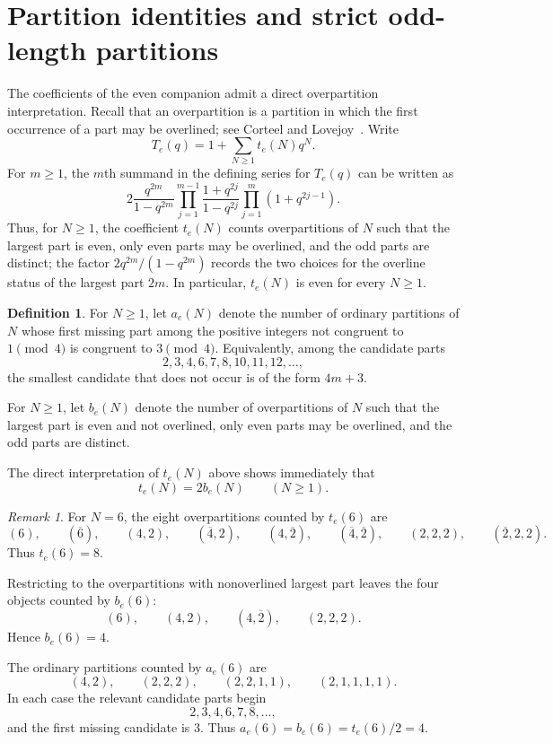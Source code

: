 \documentclass[reqno]{amsart}
\theoremstyle{plain}
\theoremstyle{definition}
\newtheorem{definition}{Definition}
\theoremstyle{remark}
\newtheorem{remark}{Remark}
\numberwithin{equation}{section}
\begin{document}
\section{Partition identities and strict odd-length partitions}\label{sec:partition-identities}
%
The coefficients of the even companion admit a direct overpartition interpretation. Recall that an overpartition is a partition in which the first occurrence of a part may be overlined; see Corteel and Lovejoy~\cite{CorteelLovejoy}. Write
\[
T_e(q)=1+\sum_{N\ge 1} t_e(N)q^N.
\]
For $m\ge 1$, the $m$th summand in the defining series for $T_e(q)$ can be written as
\[
2\frac{q^{2m}}{1-q^{2m}}
\prod_{j=1}^{m-1}\frac{1+q^{2j}}{1-q^{2j}}
\prod_{j=1}^{m}(1+q^{2j-1}).
\]
Thus, for $N\ge 1$, the coefficient $t_e(N)$ counts overpartitions of $N$ such that the largest part is even, only even parts may be overlined, and the odd parts are distinct; the factor $2q^{2m}/(1-q^{2m})$ records the two choices for the overline status of the largest part $2m$. In particular, $t_e(N)$ is even for every $N\ge 1$.

\begin{definition}\label{def:A-B}
For $N\ge 1$, let $a_e(N)$ denote the number of ordinary partitions of $N$ whose first missing part among the positive integers not congruent to $1\pmod{4}$ is congruent to $3\pmod{4}$. Equivalently, among the candidate parts
\[
2,3,4,6,7,8,10,11,12,\dots,
\]
the smallest candidate that does not occur is of the form $4m+3$.

For $N\ge 1$, let $b_e(N)$ denote the number of overpartitions of $N$ such that the largest part is even and not overlined, only even parts may be overlined, and the odd parts are distinct.
\end{definition}

The direct interpretation of \(t_e(N)\) above shows immediately that
\begin{equation}\label{te-be}
t_e(N)=2b_e(N)\qquad(N\ge 1).
\end{equation}

\begin{remark}\label{rem:Te-example}
For $N=6$, the eight overpartitions counted by $t_e(6)$ are
\[
(6),\qquad (\overline{6}),\qquad (4,2),\qquad (\overline{4},2),\qquad (4,\overline{2}),\qquad (\overline{4},\overline{2}),\qquad (2,2,2),\qquad (\overline{2},2,2).
\]
Thus $t_e(6)=8$.

Restricting to the overpartitions with nonoverlined largest part leaves the four objects counted by $b_e(6)$:
\[
(6),\qquad (4,2),\qquad (4,\overline{2}),\qquad (2,2,2).
\]
Hence $b_e(6)=4$.

The ordinary partitions counted by $a_e(6)$ are
\[
(4,2),\qquad (2,2,2),\qquad (2,2,1,1),\qquad (2,1,1,1,1).
\]
In each case the relevant candidate parts begin
\[
2,3,4,6,7,8,\dots,
\]
and the first missing candidate is $3$. Thus $a_e(6)=b_e(6)=t_e(6)/2=4$.
\end{remark}
\end{document}
